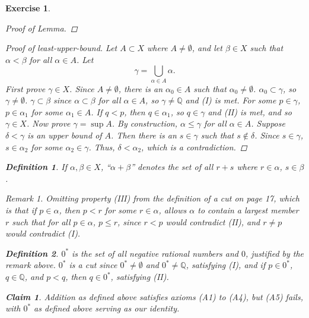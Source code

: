 \documentclass[10pt,letterpaper]{amsart}
\newtheorem{exercise}{Exercise}[section]
\newtheorem*{claim}{Claim}
\theoremstyle{definition}
\newtheorem*{definition}{Definition}
\theoremstyle{remark}
\newtheorem*{remark}{Remark}
\numberwithin{equation}{exercise}
\begin{document}
\begin{multicols}{2}
\begin{exercise}
\begin{proof}[Proof of Lemma]
    \end{proof}
    \begin{proof}[Proof of least-upper-bound]
      Let $A \subset X$ where $A \ne \emptyset$, and let $\beta \in X$ such that $\alpha < \beta$ for all $\alpha \in A$. Let
      \begin{equation*}
        \gamma = \bigcup_{\alpha \in A} \alpha.
      \end{equation*}
      First prove $\gamma \in X$. Since $A \ne \emptyset$, there is an $\alpha_0 \in A$ such that $\alpha_0 \ne \emptyset$. $\alpha_0 \subset \gamma$, so $\gamma \ne \emptyset$. $\gamma \subset \beta$ since $\alpha \subset \beta$ for all $\alpha \in A$, so $\gamma \ne \mathbb{Q}$ and (I) is met. For some $p \in \gamma$, $p \in \alpha_1$ for some $\alpha_1 \in A$. If $q < p$, then $q \in \alpha_1$, so $q \in \gamma$ and (II) is met, and so $\gamma \in X$. Now prove $\gamma = \sup A$. By construction, $\alpha \le \gamma$ for all $\alpha \in A$. Suppose $\delta < \gamma$ is an upper bound of $A$. Then there is an $s \in \gamma$ such that $s \notin \delta$. Since $s \in \gamma$, $s \in \alpha_2$ for some $\alpha_2 \in \gamma$. Thus, $\delta < \alpha_2$, which is a contradiction.
    \end{proof}
    \begin{definition}
      If $\alpha,\beta \in X$, ``$\alpha+\beta$'' denotes the set of all $r + s$ where $r \in \alpha$, $s \in \beta$.
    \end{definition}
    \begin{remark}
      Omitting property (III) from the definition of a cut on page 17, which is that if $p \in \alpha$, then $p < r$ for some $r \in \alpha$, allows $\alpha$ to contain a largest member $r$ such that for all $p \in \alpha$, $p \le r$, since $r < p$ would contradict (II), and $r \ne p$ would contradict (I).
    \end{remark}
    \begin{definition}
      $0^*$ is the set of all negative rational numbers and $0$, justified by the remark above. $0^*$ is a cut since $0^* \ne \emptyset$ and $0^* \ne \mathbb{Q}$, satisfying (I), and if $p \in 0^*$, $q \in \mathbb{Q}$, and $p < q$, then $q \in 0^*$, satisfying (II).
    \end{definition}
    \begin{claim}
      Addition as defined above satisfies axioms \emph{(A1)} to \emph{(A4)}, but \emph{(A5)} fails, with $0^*$ as defined above serving as our identity.
    \end{claim}

\end{exercise}
\end{multicols}
\end{document}
